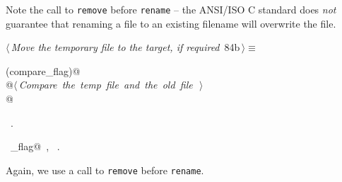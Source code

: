 \documentclass[a4paper]{report}
\begin{document}
Note the call to \verb|remove| before \verb|rename| -- the ANSI/ISO C
standard does {\em not} guarantee that renaming a file to an existing
filename will overwrite the file.

\begin{flushleft} \small
\begin{minipage}{\linewidth}\label{scrap173}\raggedright\small
{} $\langle\,${\it Move the temporary file to the target, if required}\nobreak\ {\footnotesize {84b}}$\,\rangle\equiv$
\vspace{-1ex}
\begin{list}{}{} \item
\mbox{}\verb@if (compare_flag)@\\
\mbox{}\verb@  @\hbox{$\langle\,${\it Compare the temp file and the old file}\nobreak\ {\footnotesize {}}$\,\rangle$}\verb@@\\
\mbox{}@\\
\mbox{}\verb@@{\NWsep}
\end{list}
\vspace{-1.5ex}
\footnotesize
\begin{list}{}{\setlength{\itemsep}{-\parsep}\setlength{\itemindent}{-\leftmargin}}
\item \NWtxtMacroRefIn\ .
\item \NWtxtIdentsUsed\nobreak\  \verb@compare_flag@\nobreak\ , \verb@remove@\nobreak\ .
\item{}
\end{list}
\end{minipage}\vspace{4ex}
\end{flushleft}
Again, we use a call to \verb|remove| before \verb|rename|.
\end{document}
